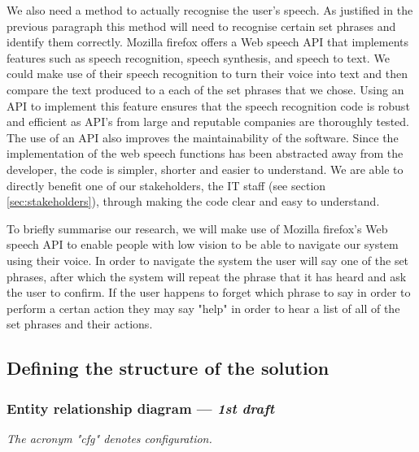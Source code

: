 We also need a method to actually recognise the user's speech.
As justified in the previous paragraph this method will need
to recognise certain set phrases and identify them correctly.
Mozilla firefox offers a Web speech API that implements 
features such as speech recognition, speech synthesis, and
speech to text. We could make use of their speech recognition
to turn their voice into text and then compare the text
produced to a each of the set phrases that we chose. Using an
API to implement this feature ensures that the speech recognition
code is robust and efficient as API's from large and reputable
companies are thoroughly tested. The use of an API also 
improves the maintainability of the software. Since the
implementation of the web speech functions has been abstracted 
away from the developer, the code is simpler, shorter and easier
to understand. We are able to directly benefit one of our
stakeholders, the IT staff (see section \ref{sec:stakeholders}),
through making the code clear and easy to understand.\\ \vspace{0.2cm}

To briefly summarise our research, we will make use of Mozilla
firefox's Web speech API to enable people with low vision to be 
able to navigate our system using their voice. In order to navigate
the system the user will say one of the set phrases, after which the 
system will repeat the phrase that it has heard and ask the user 
to confirm. If the user happens to forget which phrase to say in 
order to perform a certan action they may say "help" in order to 
hear a list of all of the set phrases and their actions.

\subsection{Defining the structure of the solution}

\subsubsection{Entity relationship diagram — \textit{1st draft}}
\label{sec:erdd}


\textit{The acronym "cfg" denotes configuration.}

